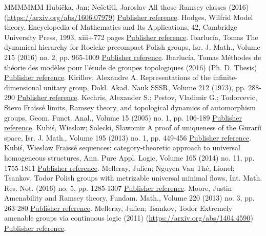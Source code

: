 \begin{thebibliography}{MMMMMM}
 Hubička, Jan; Nešetřil, Jaroslav All those Ramsey classes (2016) (\url{https://arxiv.org/abs/1606.07979}) \href{https://ahl.centre-mersenne.org/item/AHL_2019__2__149_0/#HN}{Publisher reference}.
 Hodges, Wilfrid Model theory, Encyclopedia of Mathematics and Its Applications, 42, Cambridge University Press, 1993, xiii+772 pages \href{https://ahl.centre-mersenne.org/item/AHL_2019__2__149_0/#H}{Publisher reference}.
 Ibarlucía, Tomas The dynamical hierarchy for Roelcke precompact Polish groups, Isr. J. Math., Volume 215 (2016) no. 2, pp. 965-1009 \href{https://ahl.centre-mersenne.org/item/AHL_2019__2__149_0/#I1}{Publisher reference}.
 Ibarlucía, Tomas Méthodes de théorie des modèles pour l’étude de groupes topologiques (2016) (Ph. D. Thesis) \href{https://ahl.centre-mersenne.org/item/AHL_2019__2__149_0/#I0}{Publisher reference}.
 Kirillov, Alexandre A. Representations of the infinite-dimensional unitary group, Dokl. Akad. Nauk SSSR, Volume 212 (1973), pp. 288-290 \href{https://ahl.centre-mersenne.org/item/AHL_2019__2__149_0/#Ki}{Publisher reference}.
 Kechris, Alexander S.; Pestov, Vladimir G.; Todorcevic, Stevo Fraïssé limits, Ramsey theory, and topological dynamics of automorphism groups, Geom. Funct. Anal., Volume 15 (2005) no. 1, pp. 106-189 \href{https://ahl.centre-mersenne.org/item/AHL_2019__2__149_0/#KPT}{Publisher reference}.
 Kubiś, Wiesław; Solecki, Sławomir A proof of uniqueness of the Gurariĭ space, Isr. J. Math., Volume 195 (2013) no. 1, pp. 449-456 \href{https://ahl.centre-mersenne.org/item/AHL_2019__2__149_0/#KuS}{Publisher reference}.
 Kubiś, Wiesław Fraïssé sequences: category-theoretic approach to universal homogeneous structures, Ann. Pure Appl. Logic, Volume 165 (2014) no. 11, pp. 1755-1811 \href{https://ahl.centre-mersenne.org/item/AHL_2019__2__149_0/#Ku}{Publisher reference}.
 Melleray, Julien; Nguyen Van Thé, Lionel; Tsankov, Todor Polish groups with metrizable universal minimal flows, Int. Math. Res. Not. (2016) no. 5, pp. 1285-1307 \href{https://ahl.centre-mersenne.org/item/AHL_2019__2__149_0/#MNT}{Publisher reference}.
 Moore, Justin Amenability and Ramsey theory, Fundam. Math., Volume 220 (2013) no. 3, pp. 263-280 \href{https://ahl.centre-mersenne.org/item/AHL_2019__2__149_0/#M}{Publisher reference}.
 Melleray, Julien; Tsankov, Todor Extremely amenable groups via continuous logic (2011) (\url{https://arxiv.org/abs/1404.4590}) \href{https://ahl.centre-mersenne.org/item/AHL_2019__2__149_0/#MT}{Publisher reference}.

\end{thebibliography}
